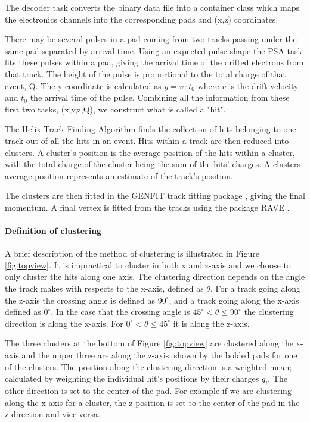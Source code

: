 \documentclass[review]{elsarticle}
\begin{document}
The decoder task converts the binary data file into a container class which maps the electronics channels into the corresponding pads and (x,z) coordinates. 

There may be several pulses in a pad coming from two tracks passing under the same pad separated  by arrival time. Using an expected pulse shape the PSA task fits these pulses within a pad, giving the arrival time of the drifted electrons from that track. The height of the pulse is proportional to the total charge of that event, Q. The y-coordinate is calculated as $y = v\cdot t_0$ where $v$ is the drift velocity and $t_0$ the arrival time of the pulse. Combining all the information from these first two tasks, (x,y,z,Q), we construct what is called a "hit". 

 The Helix Track Finding Algorithm finds the collection of hits belonging to one track out of all the hits in an event. Hits within a track are then reduced into clusters. A cluster's position is the average position of the hits within a cluster, with the total charge of the cluster being the sum of the hits' charges. A clusters average position represents an estimate of the track's position. 
 
 The clusters are then fitted in the GENFIT track fitting package \cite{genfit}, giving the final momentum. A final vertex is fitted from the tracks using the package RAVE \cite{rave}. 


\paragraph{Definition of clustering}

A brief description of the method of clustering is illustrated in Figure \ref{fig:topview}. It is impractical to cluster in both x and z-axis and we choose to only cluster the hits along one axis. The clustering direction depends on the angle the track makes with respects to the x-axis, defined as $\theta$. For a track going along the z-axis the crossing angle is defined as $90^{\circ}$, and a track going along the x-axis defined as $0^{\circ}$. In the case that the crossing angle is $45^{\circ} < \theta \leq 90^{\circ} $ the clustering direction is along the x-axis. For $0^{\circ} < \theta \leq 45^{\circ}$ it is along the z-axis. 

The three clusters at the bottom of Figure \ref{fig:topview} are clustered along the x-axis and the upper three are along the z-axis, shown by the bolded pads for one of the clusters. The position along the clustering direction is a weighted mean; calculated by weighting the individual hit's positions by their charges $q_i$. The other direction is set to the center of the pad. For example if we are clustering along the x-axis for a cluster, the z-position is set to the center of the pad in the z-direction and vice versa. 
\end{document}
